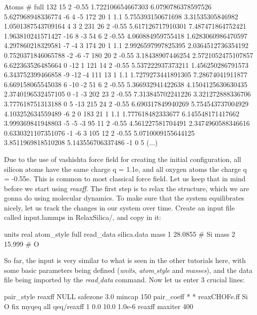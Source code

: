 \begin{lcverbatim}
Atoms # full
132 15 2 -0.55 1.722106654667303 6.0790786378597526 5.627968948336774 -6 4 -5
172 20 1 1.1 5.755393150671698 3.31535305846982 1.0501387543709164 4 3 2
231 26 2 -0.55 5.617126717910301 7.487471864752421 1.963810241571427 -16 8 -3
54 6 2 -0.55 4.060884959755418 1.6283060986470597 4.297860218329581 -7 -4 3
174 20 1 1.1 2.9926597997825395 2.0364512736354192 0.7520371846065788 -2 -6 -7
180 20 2 -0.55 3.18438907446254 2.5721052475107857 6.622363526485664 0 -12 1
121 14 2 -0.55 5.537222937373211 1.456250286791573 6.343752399466858 -9 -12 -4
111 13 1 1.1 1.7279273441891305 7.28674041911877 6.669158065545038 6 -10 -2
51 6 2 -0.55 5.366932941422638 4.1504125630630435 2.3740196532457105 0 -1 -3
202 23 2 -0.55 7.313845702241226 3.321272888336706 3.777618751313188 0 5 -13
215 24 2 -0.55 6.690317849940269 5.754543737004929 4.103252634559489 -6 2 0
183 21 1 1.1 1.777618482333677 6.145548171417662 3.999369841948803 -5 -5 -3
95 11 2 -0.55 4.561227581704491 2.3474960588346616 0.6330321107351076 -1 -6 3
105 12 2 -0.55 5.0710009155644125 3.8511969818510208 5.143556706337486 -1 0 5
(...)
\end{lcverbatim}

\noindent Due to the use of vashishta force field for creating the initial configuration,
all silicon atoms have the same charge q = 1.1e,
and all oxygen atoms the charge q = -0.55e. This is common to most
classical force field. Let us keep that in mind before we start using \textit{reaxff}.
The first step is to relax the structure, which we are gonna do using molecular
dynamics. To make sure that the system equilibrates nicely, let us track the
changes in our system over time. 
Create an input file called input.lammps in RelaxSilica/, and copy in it: 

\begin{lcverbatim}
units real
atom_style full
read_data silica.data
mass 1 28.0855 # Si
mass 2 15.999 # O
\end{lcverbatim}

\noindent So far, the input is very similar to what is seen in the other tutorials here,
with some basic parameters being defined (\textit{units}, \textit{atom$\_$style} and \textit{masses}), and 
the data file being imported by the \textit{read$\_$data} command.
Now let us enter 3 crucial lines:

\begin{lcverbatim}
pair_style reaxff NULL safezone 3.0 mincap 150
pair_coeff * * reaxCHOFe.ff Si O
fix myqeq all qeq/reaxff 1 0.0 10.0 1.0e-6 reaxff maxiter 400
\end{lcverbatim}

